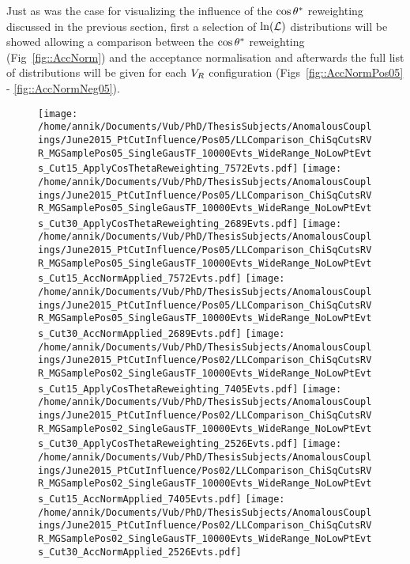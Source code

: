Just as was the case for visualizing the influence of the $\cos \theta^{*}$ reweighting discussed in the previous section, first a selection of $\ln(\mathcal{L})$ distributions will be showed allowing a comparison between the $\cos \theta^{*}$ reweighting (Fig~\ref{fig::AccNorm}) and the acceptance normalisation and afterwards the full list of distributions will be given for each $V_{R}$ configuration (Figs~\ref{fig::AccNormPos05} - \ref{fig::AccNormNeg05}).

\begin{figure}[h!t]
 \centering
 \texttt{[image: /home/annik/Documents/Vub/PhD/ThesisSubjects/AnomalousCouplings/June2015\_PtCutInfluence/Pos05/LLComparison\_ChiSqCutsRVR\_MGSamplePos05\_SingleGausTF\_10000Evts\_WideRange\_NoLowPtEvts\_Cut15\_ApplyCosThetaReweighting\_7572Evts.pdf]}
 \texttt{[image: /home/annik/Documents/Vub/PhD/ThesisSubjects/AnomalousCouplings/June2015\_PtCutInfluence/Pos05/LLComparison\_ChiSqCutsRVR\_MGSamplePos05\_SingleGausTF\_10000Evts\_WideRange\_NoLowPtEvts\_Cut30\_ApplyCosThetaReweighting\_2689Evts.pdf]}
 \texttt{[image: /home/annik/Documents/Vub/PhD/ThesisSubjects/AnomalousCouplings/June2015\_PtCutInfluence/Pos05/LLComparison\_ChiSqCutsRVR\_MGSamplePos05\_SingleGausTF\_10000Evts\_WideRange\_NoLowPtEvts\_Cut15\_AccNormApplied\_7572Evts.pdf]}
 \texttt{[image: /home/annik/Documents/Vub/PhD/ThesisSubjects/AnomalousCouplings/June2015\_PtCutInfluence/Pos05/LLComparison\_ChiSqCutsRVR\_MGSamplePos05\_SingleGausTF\_10000Evts\_WideRange\_NoLowPtEvts\_Cut30\_AccNormApplied\_2689Evts.pdf]}
 \texttt{[image: /home/annik/Documents/Vub/PhD/ThesisSubjects/AnomalousCouplings/June2015\_PtCutInfluence/Pos02/LLComparison\_ChiSqCutsRVR\_MGSamplePos02\_SingleGausTF\_10000Evts\_WideRange\_NoLowPtEvts\_Cut15\_ApplyCosThetaReweighting\_7405Evts.pdf]}
 \texttt{[image: /home/annik/Documents/Vub/PhD/ThesisSubjects/AnomalousCouplings/June2015\_PtCutInfluence/Pos02/LLComparison\_ChiSqCutsRVR\_MGSamplePos02\_SingleGausTF\_10000Evts\_WideRange\_NoLowPtEvts\_Cut30\_ApplyCosThetaReweighting\_2526Evts.pdf]}
 \texttt{[image: /home/annik/Documents/Vub/PhD/ThesisSubjects/AnomalousCouplings/June2015\_PtCutInfluence/Pos02/LLComparison\_ChiSqCutsRVR\_MGSamplePos02\_SingleGausTF\_10000Evts\_WideRange\_NoLowPtEvts\_Cut15\_AccNormApplied\_7405Evts.pdf]}
 \texttt{[image: /home/annik/Documents/Vub/PhD/ThesisSubjects/AnomalousCouplings/June2015\_PtCutInfluence/Pos02/LLComparison\_ChiSqCutsRVR\_MGSamplePos02\_SingleGausTF\_10000Evts\_WideRange\_NoLowPtEvts\_Cut30\_AccNormApplied\_2526Evts.pdf]}

\end{figure}
